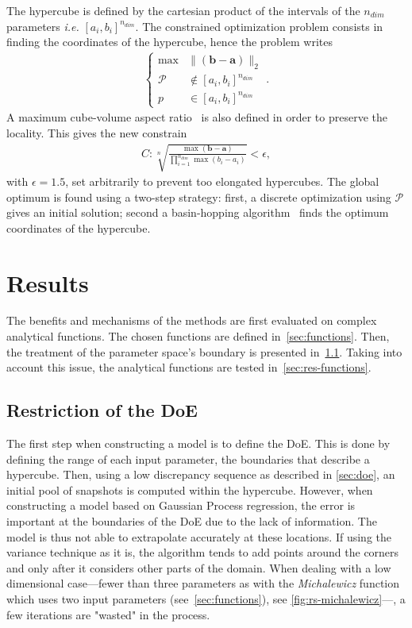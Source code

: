 The hypercube is defined by the cartesian product of the intervals of the ${n_{dim}}$ parameters \textit{i.e.} $[a_i, b_i]^{n_{dim}}$. The constrained optimization problem consists in finding the coordinates of the hypercube, hence the problem writes
\begin{align}
\left\{\begin{array}{rc} \max  &\parallel (\mathbf{b} - \mathbf{a}) \parallel_{2} \\\mathcal{P} &\notin [a_i, b_i]^{n_{dim}} \\ p &\in [a_i, b_i]^{n_{dim}} \end{array}\right. .
\end{align}
A maximum cube-volume aspect ratio~\cite{smith1998} is also defined in order to preserve the locality. This gives the new constrain
\begin{align}
C : \sqrt[n]{\frac{\max (\mathbf{b} - \mathbf{a})}{\displaystyle\prod_{i = 1}^{n_{dim}} \max (b_i - a_i)}} < \epsilon ,
\end{align}
with $\epsilon = 1.5$, set arbitrarily to prevent too elongated hypercubes. The global optimum is found using a two-step strategy: first, a discrete optimization using $\mathcal{P}$ gives an initial solution; second a basin-hopping algorithm~\cite{wales1997} finds the optimum coordinates of the hypercube.


\section{Results}
\label{sec:results}

The benefits and mechanisms of the methods are first evaluated on complex analytical functions. The chosen functions are defined in~\cref{sec:functions}. Then, the treatment of the parameter space's boundary is presented in~\cref{sec:delta-space}. Taking into account this issue, the analytical functions are tested in~\cref{sec:res-functions}.

\subsection{Restriction of the DoE}
\label{sec:delta-space}

The first step when constructing a model is to define the DoE. This is done by defining the range of each input parameter, the boundaries that describe a hypercube. Then, using a low discrepancy sequence as described in \cref{sec:doe}, an initial pool of snapshots is computed within the hypercube. However, when constructing a model based on Gaussian Process regression, the error is important at the boundaries of the DoE due to the lack of information. The model is thus not able to extrapolate accurately at these locations. If using the variance technique as it is, the algorithm tends to add points around the corners and only after it considers other parts of the domain. When dealing with a low dimensional case---fewer than three parameters as with the \textit{Michalewicz} function which uses two input parameters (see~\cref{sec:functions}), see \cref{fig:rs-michalewicz}---, a few iterations are "wasted" in the process.

